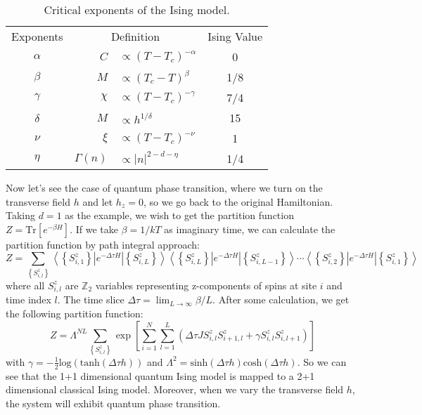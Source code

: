 \documentclass{article}
\theoremstyle{plain} \newtheorem{thm}{Theorem}[section]
\theoremstyle{definition} \newtheorem{df}{Definition}[section]
\theoremstyle{definition} \newtheorem{eg}{Example}
\theoremstyle{remark} \newtheorem*{rmk}{Remark}
\begin{document}
\begin{table}[htpb]
  \centering
  \caption{Critical exponents of the Ising model.}
  \label{tab:critical_exponents}
  \begin{tabular}{crlc}
    \toprule
    Exponents & \multicolumn{2}{c}{Definition} & Ising Value \\
    $\alpha$ & $C$ & $ \propto (T-T_c)^{-\alpha}$ & 0 \\
    $\beta$ & $M$ & $ \propto (T_c-T)^\beta$ & 1/8 \\
    $\gamma$ & $\chi$ & $ \propto (T-T_c)^{-\gamma}$ & 7/4 \\
    $\delta$ & $M$ & $ \propto h^{1/\delta}$ & 15 \\
    \midrule
    $\nu$ & $\xi$ & $ \propto (T-T_c)^{-\nu}$ & 1 \\
    $\eta$ & $\varGamma(n)$ & $ \propto |n|^{2-d-\eta}$ & 1/4 \\
    \bottomrule
  \end{tabular}
\end{table}

Now let's see the case of quantum phase transition, where we turn on the transverse field $h$ and let $h_z=0$, so we go back to the original Hamiltonian. Taking $d=1$ as the example, we wish to get the partition function $Z=\mathrm{Tr}[e^{-\beta H}]$. If we take $\beta=1/kT$ as imaginary time, we can calculate the partition function by path integral approach:
\begin{equation}
	Z=\sum_{\left\lbrace S^z_{i,l}\right\rbrace }\left\langle \left\lbrace S_{i,1}^z\right\rbrace|e^{-\Delta\tau H}|\left\lbrace S_{i,L}^z\right\rbrace\right\rangle\left\langle \left\lbrace S_{i,L}^z\right\rbrace|e^{-\Delta\tau H}|\left\lbrace S_{i,L-1}^z\right\rbrace\right\rangle
	\cdots\left\langle \left\lbrace S_{i,2}^z\right\rbrace|e^{-\Delta\tau H}|\left\lbrace S_{i,1}^z\right\rbrace\right\rangle
\end{equation}
where all $S^z_{i,l}$ are $\mathbb{Z}_2$ variables representing z-components of spins at site $i$ and time index $l$. The time slice $\Delta\tau=\lim_{L\rightarrow\infty}\beta/L$. After some calculation, we get the following partition function:
\begin{equation}
	Z=\Lambda^{NL}\sum_{\left\lbrace S^z_{i,l}\right\rbrace }\exp[\sum_{i=1}^N\sum_{l=1}^L(\Delta\tau JS^z_{i,l}S^z_{i+1,l}+\gamma S^z_{i,l}S^z_{i,l+1})]
\end{equation}
with $\gamma=-\frac{1}{2}\mathrm{log}(\mathrm{tanh}(\Delta\tau h))$ and $\Lambda^2=\mathrm{sinh}(\Delta\tau h)\mathrm{cosh}(\Delta\tau h)$. So we can see that the 1+1 dimensional quantum Ising model is mapped to a 2+1 dimensional classical Ising model. Moreover, when we vary the transverse field $h$, the system will exhibit quantum phase transition.
\end{document}
